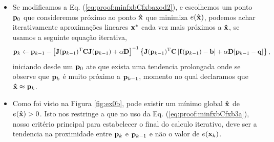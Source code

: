 \begin{myproofT}
\begin{itemize}
\item Se modificamos a Eq. (\ref{eq:proof:minfxbCfxbaxod2}), e escolhemos um ponto  
$\VECTOR{p}_0$ que consideremos próximo ao ponto $\VECTOR{\hat{x}}$ que minimiza $e(\VECTOR{\hat{x}})$,
podemos achar iterativamente aproximações lineares $\VECTOR{x}^*$ cada vez mais próximos a  $\VECTOR{\hat{x}}$,
se usamos a seguinte equação iterativa,
\begin{equation}\label{eq:proof:minfxbCfxbaxod3}
\VECTOR{p}_{k} \leftarrow \VECTOR{p}_{k-1} -
\left[ \MATRIX{J}(\VECTOR{p}_{k-1})^{\transpose}\MATRIX{C} \MATRIX{J}(\VECTOR{p}_{k-1}) +\alpha \MATRIX{D}\right]^{-1}
\left\{ \MATRIX{J}(\VECTOR{p}_{k-1})^{\transpose}\MATRIX{C} \left[\VECTOR{f}(\VECTOR{p}_{k-1})-\VECTOR{b}\right]+
\alpha\MATRIX{D}[\VECTOR{p}_{k-1}-\VECTOR{q}]\right\},
\end{equation}
iniciando desde um $\VECTOR{p}_{0}$ 
ate que exista uma tendencia prolongada onde se observe que $\VECTOR{p}_{k}$ é muito próximo a $\VECTOR{p}_{k-1}$,
momento no qual declaramos que $\VECTOR{\hat{x}} \approx \VECTOR{p}_{k}$.
\item Como foi visto na Figura  \ref{fig:ex0b},
pode existir um mínimo global $\VECTOR{\hat{x}}$ de $e(\VECTOR{\hat{x}}) > 0$.
Isto nos restringe a que no uso da Eq. (\ref{eq:proof:minfxbCfxb3a}),
nosso critério principal para estabelecer o final do calculo iterativo,
deve ser a tendencia na  proximidade entre $\VECTOR{p}_{k}$ e $\VECTOR{p}_{k-1}$ 
e não o valor de $e(\VECTOR{x}_k)$.
\end{itemize}~

























\end{myproofT}
